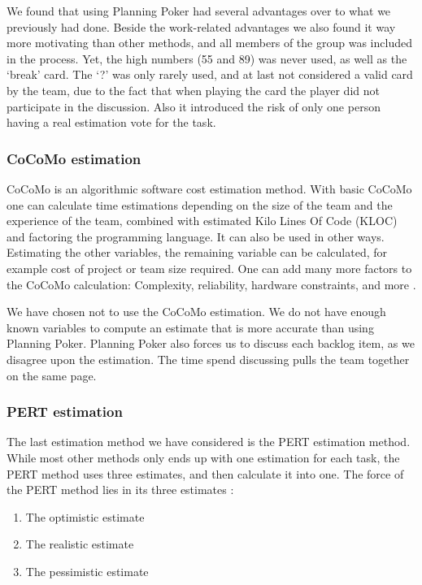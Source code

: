 We found that using Planning Poker had several advantages over to what we previously had done. Beside the work-related advantages we also found it way more motivating than other methods, and all members of the group was included in the process. Yet, the high numbers (55 and 89) was never used, as well as the `break' card. The `?' was only rarely used, and at last not considered a valid card by the team, due to the fact that when playing the card the player did not participate in the discussion. Also it introduced the risk of only one person having a real estimation vote for the task.

\subsubsection{CoCoMo estimation}
CoCoMo is an algorithmic software cost estimation method. With basic CoCoMo one can calculate time estimations depending on the size of the team and the experience of the team, combined with estimated Kilo Lines Of Code (KLOC) and factoring the programming language. It can also be used in other ways. Estimating the other variables, the remaining variable can be calculated, for example cost of project or team size required. One can add many more factors to the CoCoMo calculation: Complexity, reliability, hardware constraints, and more \cite[p. 147]{PM}.

We have chosen not to use the CoCoMo estimation. We do not have enough known variables to compute an estimate that is more accurate than using Planning Poker. Planning Poker also forces us to discuss each backlog item, as we disagree upon the estimation. The time spend discussing pulls the team together on the same page. 

\subsubsection{PERT estimation}
The last estimation method we have considered is the PERT estimation method. While most other methods only ends up with one estimation for each task, the PERT method uses three estimates, and then calculate it into one. The force of the PERT method lies in its three estimates \cite[p. 152]{PM}:

\begin{enumerate}[label=\Alph{*}\hspace{0.8em}]
	\item The optimistic estimate
	\item The realistic estimate
	\item The pessimistic estimate
\end{enumerate}

